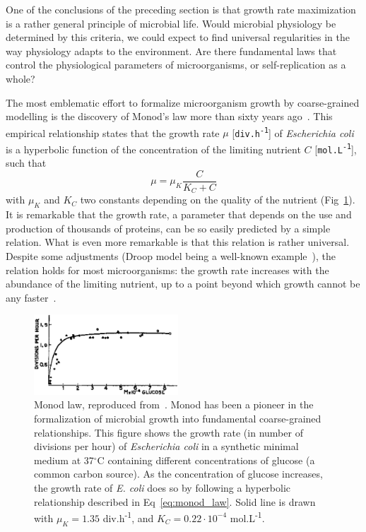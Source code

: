 One of the conclusions of the preceding section is that growth rate maximization is a rather general principle of microbial life.
Would microbial physiology be determined by this criteria, we could expect to find universal regularities in the way physiology adapts to the environment.
Are there fundamental laws that control the physiological parameters of microorganisms, or self-replication as a whole?

The most emblematic effort to formalize microorganism growth by coarse-grained modelling is the discovery of Monod's law more than sixty years ago~\cite{monod_growth_1949}.
This empirical relationship states that the growth rate $\mu$ [\texttt{div.h\textsuperscript{-1}}] of \textit{Escherichia coli} is a hyperbolic function of the concentration of the limiting nutrient $C$ [\texttt{mol.L\textsuperscript{-1}}], such that
\begin{equation}
\label{eq:monod_law}
\mu = \mu_K \frac{C}{K_C + C}
\end{equation}
with $\mu_K$ and $K_C$ two constants depending on the quality of the nutrient (Fig~\ref{fig:monod_law}).
It is remarkable that the growth rate, a parameter that depends on the use and production of thousands of proteins, can be so easily predicted by a simple relation.
What is even more remarkable is that this relation is rather universal.
Despite some adjustments (Droop model being a well-known example~\cite{droop_thoughts_1973}), the relation holds for most microorganisms: the growth rate increases with the abundance of the limiting nutrient, up to a point beyond which growth cannot be any faster~\cite{koch_why_1988}.

\begin{figure}[!h]
\centering
\includegraphics[height=3cm]{./Fig/Chapter1/monod_law.eps}
\caption{Monod law, reproduced from~\cite{monod_growth_1949}.
Monod has been a pioneer in the formalization of microbial growth into fundamental coarse-grained relationships.
This figure shows the growth rate (in number of divisions per hour) of \textit{Escherichia coli} in a synthetic minimal medium at 37$^{\circ}$C containing different concentrations of glucose (a common carbon source).
As the concentration of glucose increases, the growth rate of \textit{E. coli} does so by following a hyperbolic relationship described in Eq~\ref{eq:monod_law}.
Solid line is drawn with $\mu_K = 1.35$ div.h\textsuperscript{-1}, and $K_C = 0.22 \cdot 10^{-4}$ mol.L\textsuperscript{-1}.
}
\label{fig:monod_law}
\end{figure}

